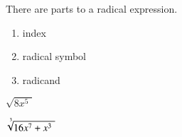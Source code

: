     There are  parts to a radical expression.\\
    \begin{minipage}{0.5\linewidth}
        \begin{enumerate}[itemsep=0pt]
            \item index
            \item radical symbol
            \item radicand
        \end{enumerate}
    \end{minipage}
    \hfill
    \begin{minipage}{0.24\linewidth}
    \begin{center}
        \huge
        \centering
            $\displaystyle \sqrt{8x^5\,\,}  $ \\
    \end{center}
    \end{minipage}
    \hfill
    \begin{minipage}{0.24\linewidth}
    \begin{center}
        \huge
        \centering
            $\displaystyle \sqrt[\uproot{4}\leftroot{-1}3]{16x^7+x^3\,\,}  $ \\
    \end{center}
    \end{minipage}